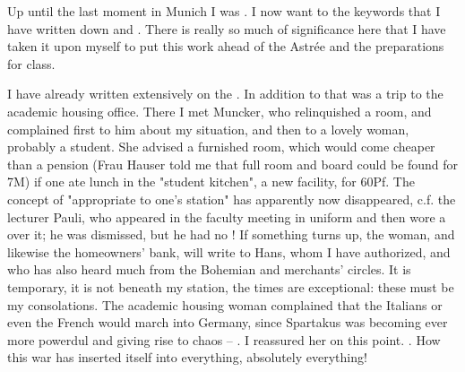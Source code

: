 
Up until the last moment in Munich I was . I now want to  the keywords that I have written down and . There is really so much of significance here that I have taken it upon myself to put this work ahead of the Astrée and the preparations for class.

I have already written extensively on the  . In addition to that was a trip to the academic housing office. There I met Muncker, who  relinquished a room, and complained first to him about my situation, and then to a lovely  woman, probably a student. She advised a furnished room, which would come cheaper than a pension (Frau Hauser told me that full room and board could be found for 7M) if one ate lunch in the "student kitchen", a new facility, for 60Pf. The concept of "appropriate to one's station" has apparently now disappeared, c.f. the lecturer Pauli, who appeared in the faculty meeting in uniform and then wore a  over it; he was dismissed, but he had no ! If something turns up, the woman, and likewise the homeowners' bank, will write to Hans, whom I have authorized, and who has also heard much from the Bohemian and merchants' circles. It is temporary, it is not beneath my station, the times are exceptional: these must be my consolations. The academic housing woman complained that the Italians or even the French would march into Germany, since Spartakus was becoming ever more powerdul and giving rise to chaos -- . I reassured her on this point. . How this war has inserted itself into everything, absolutely everything!

